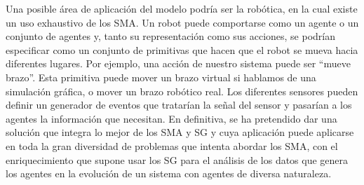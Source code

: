 \documentclass[runningheads]{llncs}
\begin{document}
	Una posible área de aplicación del modelo podría ser la robótica, en la cual existe un uso exhaustivo de los SMA.  Un robot puede comportarse como un agente o un conjunto de agentes y, tanto su representación como sus acciones, se podrían especificar como un conjunto de primitivas que hacen que el robot se mueva hacia diferentes lugares. Por ejemplo, una acción de nuestro sistema puede ser “mueve brazo”. Esta primitiva puede mover un brazo virtual si hablamos de una simulación gráfica, o mover un brazo robótico real. Los diferentes sensores pueden definir un generador de eventos que tratarían la señal del sensor y pasarían a los agentes la información que necesitan.
En definitiva, se ha pretendido dar una solución que integra lo mejor de los SMA y SG y cuya aplicación puede aplicarse en toda la gran diversidad de problemas que intenta abordar los SMA, con el enriquecimiento que supone usar los SG para el análisis de los datos que genera los agentes en la evolución de un sistema con agentes de diversa naturaleza.
\end{document}
